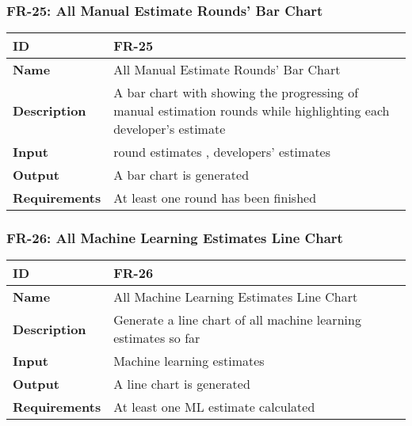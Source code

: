    \subsubsection{FR-25: All Manual Estimate Rounds' Bar Chart}
    \begin{center}
        \begin{tabularx}{\textwidth}{|l|X|}
            \hline
            \textbf{ID} & FR-25 \\
            \hline
            \textbf{Name} & All Manual Estimate Rounds' Bar Chart \\
            \hline
            \textbf{Description} & A bar chart with showing the progressing of manual estimation rounds while highlighting each developer's estimate \\
            \hline
            \textbf{Input} & round estimates , developers' estimates \\
            \hline
            \textbf{Output} & A bar chart is generated \\
            \hline
            \textbf{Requirements} & At least one round has been finished \\
            \hline
        \end{tabularx}
    \end{center}
    
    

    \subsubsection{FR-26: All Machine Learning Estimates Line Chart}
    \begin{center}
        \begin{tabularx}{\textwidth}{|l|X|}
            \hline
            \textbf{ID} & FR-26 \\
            \hline
            \textbf{Name} & All Machine Learning Estimates Line Chart \\
            \hline
            \textbf{Description} & Generate a line chart of all machine learning estimates so far \\
            \hline
            \textbf{Input} & Machine learning estimates \\
            \hline
            \textbf{Output} & A line chart is generated \\
            \hline
            \textbf{Requirements} & At least one ML estimate calculated \\
            \hline
        \end{tabularx}
    \end{center}
    
